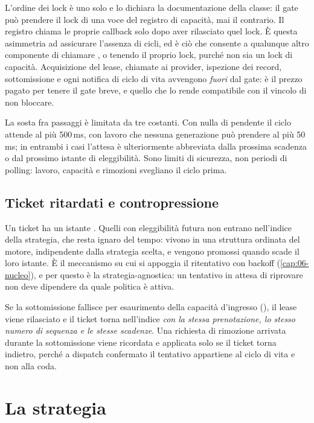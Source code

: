 L'ordine dei lock \`e uno solo e lo dichiara la documentazione della classe: il gate
pu\`o prendere il lock di una voce del registro di capacit\`a, mai il contrario. Il
registro chiama le proprie callback solo dopo aver rilasciato quel lock. \`E questa
asimmetria ad assicurare l'assenza di cicli, ed \`e ci\`o che consente a qualunque
altro componente di chiamare ,  o  tenendo
il proprio lock, purch\'e non sia un lock di capacit\`a. Acquisizione del lease,
chiamate ai provider, ispezione dei record, sottomissione e ogni notifica di
ciclo di vita avvengono \emph{fuori} dal gate: \`e il prezzo pagato per tenere il
gate breve, e quello che lo rende compatibile con il vincolo di non bloccare.

La sosta fra passaggi \`e limitata da tre costanti. Con nulla di pendente il ciclo
attende al pi\`u 500\,ms, con lavoro che nessuna generazione pu\`o prendere al pi\`u
50\,ms; in entrambi i casi l'attesa \`e ulteriormente abbreviata dalla prossima
scadenza o dal prossimo istante di eleggibilit\`a. Sono limiti di sicurezza, non
periodi di polling: lavoro, capacit\`a e rimozioni svegliano il ciclo prima.

\subsection{Ticket ritardati e contropressione}

Un ticket ha un istante . Quelli con eleggibilit\`a futura non
entrano nell'indice della strategia, che resta ignaro del tempo: vivono in una
struttura ordinata del motore, indipendente dalla strategia scelta, e vengono
promossi quando scade il loro istante. \`E il meccanismo su cui si appoggia il
ritentativo con backoff (\cref{cap:06-nucleo}), e per questo \`e la strategia-agnostica:
un tentativo in attesa di riprovare non deve dipendere da quale politica \`e attiva.

Se la sottomissione fallisce per esaurimento della capacit\`a d'ingresso
(), il lease viene rilasciato e il ticket
torna nell'indice \emph{con la stessa prenotazione, lo stesso numero di sequenza e
le stesse scadenze}. Una richiesta di rimozione arrivata durante la sottomissione
viene ricordata e applicata solo se il ticket torna indietro, perch\'e a
dispatch confermato il tentativo appartiene al ciclo di vita e non alla coda.

\section{La strategia }

